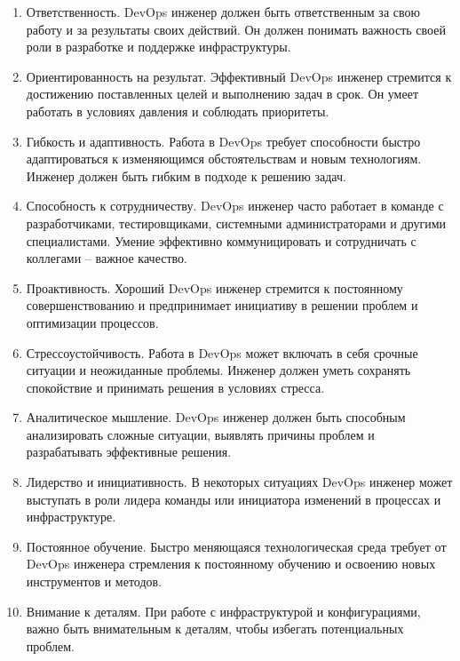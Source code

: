 \documentclass[referat]{SCWorks}
\begin{document}
\begin{enumerate}
  \item Ответственность. DevOps инженер должен быть ответственным за свою работу и за результаты своих действий. Он должен понимать важность своей роли в разработке и поддержке инфраструктуры.
  
  \item Ориентированность на результат. Эффективный DevOps инженер стремится к достижению поставленных целей и выполнению задач в срок. Он умеет работать в условиях давления и соблюдать приоритеты.
  
  \item Гибкость и адаптивность. Работа в DevOps требует способности быстро адаптироваться к изменяющимся обстоятельствам и новым технологиям. Инженер должен быть гибким в подходе к решению задач.
  
  \item Способность к сотрудничеству. DevOps инженер часто работает в команде с разработчиками, тестировщиками, системными администраторами и другими специалистами. Умение эффективно коммуницировать и сотрудничать с коллегами -- важное качество.
  
  \item Проактивность. Хороший DevOps инженер стремится к постоянному совершенствованию и предпринимает инициативу в решении проблем и оптимизации процессов.
  
  \item Стрессоустойчивость. Работа в DevOps может включать в себя срочные ситуации и неожиданные проблемы. Инженер должен уметь сохранять спокойствие и принимать решения в условиях стресса.
  
  \item Аналитическое мышление. DevOps инженер должен быть способным анализировать сложные ситуации, выявлять причины проблем и разрабатывать эффективные решения.
  
  \item Лидерство и инициативность. В некоторых ситуациях DevOps инженер может выступать в роли лидера команды или инициатора изменений в процессах и инфраструктуре.
  
  \item Постоянное обучение. Быстро меняющаяся технологическая среда требует от DevOps инженера стремления к постоянному обучению и освоению новых инструментов и методов.
  
  \item Внимание к деталям. При работе с инфраструктурой и конфигурациями, важно быть внимательным к деталям, чтобы избегать потенциальных проблем.
\end{enumerate}
\end{document}
